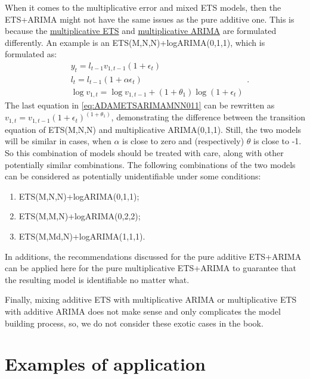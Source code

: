 \documentclass[
]{book}
\providecommand{\tightlist}{%
  \setlength{\itemsep}{0pt}\setlength{\parskip}{0pt}}
\theoremstyle{definition}
\theoremstyle{definition}
\theoremstyle{definition}
\theoremstyle{definition}
\theoremstyle{remark}
\begin{document}
When it comes to the multiplicative error and mixed ETS models, then the ETS+ARIMA might not have the same issues as the pure additive one. This is because the \protect\hyperlink{ADAMETSPureMultiplicative}{multiplicative ETS} and \protect\hyperlink{ADAMARIMAPureMultiplicative}{multiplicative ARIMA} are formulated differently. An example is an ETS(M,N,N)+logARIMA(0,1,1), which is formulated as:
\begin{equation}
  \begin{aligned}
    &{y}_{t} = l_{t-1} v_{1,t-1} (1 + \epsilon_t) \\
    &l_t = l_{t-1}(1 + \alpha \epsilon_t) \\
    &\log v_{1,t} = \log v_{1,t-1} + (1+\theta_1) \log (1 + \epsilon_t)
  \end{aligned}.
  \label{eq:ADAMETSARIMAMNN011}
\end{equation}
The last equation in \eqref{eq:ADAMETSARIMAMNN011} can be rewritten as \(v_{1,t} = v_{1,t-1} (1 + \epsilon_t)^{(1+\theta_1)}\), demonstrating the difference between the transition equation of ETS(M,N,N) and multiplicative ARIMA(0,1,1). Still, the two models will be similar in cases, when \(\alpha\) is close to zero and (respectively) \(\theta\) is close to -1. So this combination of models should be treated with care, along with other potentially similar combinations. The following combinations of the two models can be considered as potentially unidentifiable under some conditions:

\begin{enumerate}
\def\labelenumi{\arabic{enumi}.}
\tightlist
\item
  ETS(M,N,N)+logARIMA(0,1,1);
\item
  ETS(M,M,N)+logARIMA(0,2,2);
\item
  ETS(M,Md,N)+logARIMA(1,1,1).
\end{enumerate}

In additions, the recommendations discussed for the pure additive ETS+ARIMA can be applied here for the pure multiplicative ETS+ARIMA to guarantee that the resulting model is identifiable no matter what.

Finally, mixing additive ETS with multiplicative ARIMA or multiplicative ETS with additive ARIMA does not make sense and only complicates the model building process, so, we do not consider these exotic cases in the book.

\hypertarget{ADAMARIMAExamples}{%
\section{Examples of application}\label{ADAMARIMAExamples}}
\end{document}
